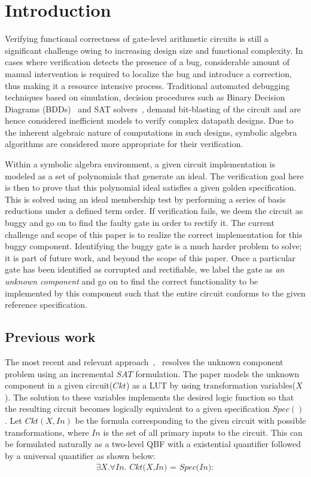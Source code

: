 \section{Introduction}
Verifying functional correctness of gate-level arithmetic circuits is
still a significant challenge owing to increasing design size and
functional complexity. In cases where verification detects the
presence of a bug, considerable amount of manual intervention is
required to localize the  bug and introduce a correction, thus making
it a resource intensive process. Traditional automated debugging
techniques based on simulation, decision procedures such as Binary
Decision Diagrams (BDDs)~\cite{bryant:1} and SAT
solvers~\cite{alanmi:2006}, demand bit-blasting of the circuit and are
hence considered inefficient models to verify complex datapath
designs. Due to the inherent algebraic nature of computations in such
designs, symbolic algebra algorithms are considered more appropriate
for their verification.  

Within a symbolic algebra environment, a given circuit implementation
is modeled as a set of polynomials that generate an ideal. The
verification goal here is then to prove that this polynomial ideal
satisfies a given golden specification. This is solved using an ideal
membership test by performing a series of \Grobner basis reductions
under a defined term order. If verification fails, we deem the circuit
as buggy and go on to find the faulty gate in order to rectify it. The
current challenge and scope of this paper is to realize the correct
implementation for this buggy component. Identifying the buggy gate is
a much harder problem to solve; it is part of future work, and beyond
the scope of this paper. Once a particular gate has been identified as
corrupted and rectifiable, we label the gate as {\it an unknown
  component} and go on to find the correct functionality to be
implemented by this component such that the entire circuit conforms to
the given reference specification.  
\vspace{-0.1in}
\subsection{Previous work}

The most recent and relevant approach~\cite{fujita:2015},~\cite{fujita:2012} resolves the unknown component problem using an incremental $SAT$ formulation. The paper models the unknown component in a given circuit($Ckt$) as a LUT by using transformation variables($X$). The solution to these variables implements the desired logic function so that the resulting circuit becomes logically equivalent to a given specification $Spec()$. Let $Ckt(X,In)$ be the formula corresponding to the given circuit with possible transformations, where $In$ is the set of all primary inputs to the circuit. This can be formulated naturally as a two-level QBF with a existential quantifier followed by a universal quantifier as shown below:
\vspace{0.1in}
\begin{align}
\exists \textit{X}.\forall \textit{In. Ckt(X,In) = Spec(In)}:    
\end{align}


